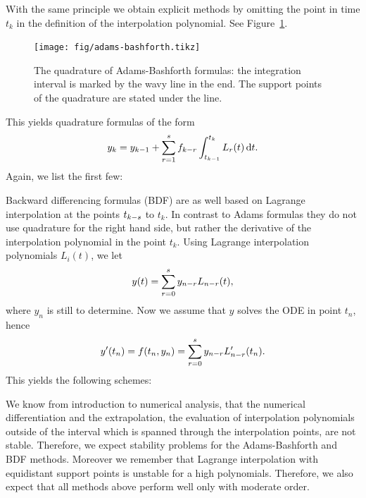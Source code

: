 \begin{example}
  \label{ex:lmm:1}
   With the same principle we obtain
  explicit methods by omitting the point in time $t_k$ in the
  definition of the interpolation polynomial. See
  Figure~\ref{fig:lmm:adams-bashforth}.
  \begin{figure}[tbp]
    \begin{center}
      \texttt{[image: fig/adams-bashforth.tikz]}
    \end{center}
    \caption{The quadrature of Adams-Bashforth formulas: the
      integration interval is marked by the wavy line in the end. The support 
			points of the quadrature are stated under the line.}
    \label{fig:lmm:adams-bashforth}
  \end{figure}
  This yields quadrature formulas of the form
  \begin{gather}
    \label{eq:lmm:17}
    y_k = y_{k-1} + \sum_{r=1}^s f_{k-r} \int_{t_{k-1}}^{t_k}
    L_r(t) \,\mathrm{d} t.
  \end{gather}
  Again, we list the first few:
  
\end{example}

\begin{example}
  \label{ex:lmm:3}
   Backward differencing formulas (BDF) are as well
  based on Lagrange interpolation at the points $t_{k-s}$ to
  $t_k$. In contrast to Adams formulas they do not use quadrature for
  the right hand side, but rather the derivative of the interpolation
  polynomial in the point $t_k$.  Using Lagrange interpolation
  polynomials $L_i(t)$, we let
  \begin{gather*}
    y(t) = \sum_{r=0}^s y_{n-r} L_{n-r}(t),
  \end{gather*}
  where $y_n$ is still to determine. Now we assume that $y$ solves the ODE
  in point $t_n$, hence
  \begin{gather*}
    y'(t_n) = f(t_n, y_n) = \sum_{r=0}^s y_{n-r} L'_{n-r}(t_n).
  \end{gather*}
  This yields the following schemes:
  
\end{example}

\begin{remark}
  We know from introduction to numerical analysis, that the numerical
  differentiation and the extrapolation, the evaluation of
  interpolation polynomials outside of the interval which is spanned
  through the interpolation points, are not stable.  Therefore, we
  expect stability problems for the Adams-Bashforth and BDF
  methods. Moreover we remember that Lagrange interpolation with
  equidistant support points is unstable for a high
  polynomials. Therefore, we also expect that all methods above
  perform well only with moderate order.
\end{remark}

